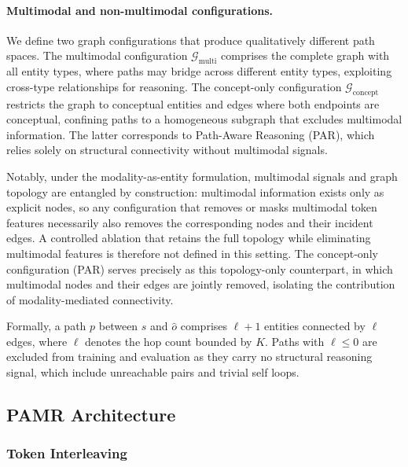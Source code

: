 \documentclass[runningheads]{llncs}
\begin{document}
\paragraph{Multimodal and non-multimodal configurations.}
We define two graph configurations that produce qualitatively different path spaces.
The multimodal configuration $\mathcal{G}_{\text{multi}}$ comprises the complete
graph with all entity types, where paths may bridge across different entity types,
exploiting cross-type relationships for reasoning.  The concept-only configuration
$\mathcal{G}_{\text{concept}}$ restricts the graph to conceptual entities and
edges where both endpoints are conceptual, confining paths to a homogeneous
subgraph that excludes multimodal information.  The latter corresponds to
Path-Aware Reasoning (PAR), which relies solely on structural connectivity
without multimodal signals.

Notably, under the modality-as-entity formulation, multimodal signals and
graph topology are entangled by construction: multimodal information exists
only as explicit nodes, so any configuration that removes or masks multimodal
token features necessarily also removes the corresponding nodes and their
incident edges. A controlled ablation that retains the full topology while
eliminating multimodal features is therefore not defined in this setting.
The concept-only configuration (PAR) serves precisely as this topology-only
counterpart, in which multimodal nodes and their edges are jointly removed,
isolating the contribution of modality-mediated connectivity.

Formally, a path $p$ between $s$ and $\hat{o}$ comprises $\ell + 1$
entities connected by $\ell$ edges, where
$\ell$ denotes the hop count bounded by $K$.
Paths with $\ell \leq 0$ are excluded from training and evaluation as they
carry no structural reasoning signal, which include unreachable pairs and
trivial self loops.

\subsection{PAMR Architecture}
\label{sec:pamr-architecture}

\subsubsection{Token Interleaving}
\label{sec:token-interleaving}
\end{document}

